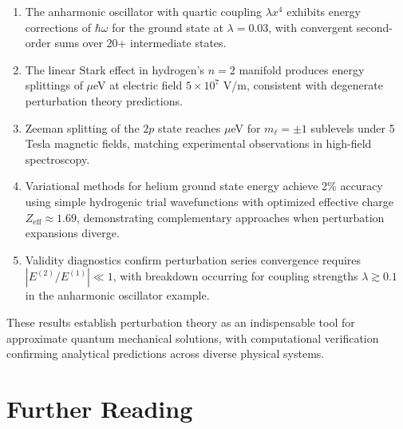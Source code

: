 \documentclass[a4paper, 11pt]{article}
\begin{document}
\begin{enumerate}
\item The anharmonic oscillator with quartic coupling $\lambda x^4$ exhibits energy
corrections of  $\hbar\omega$ for the ground state
at $\lambda = 0.03$, with convergent second-order sums over 20+ intermediate states.

\item The linear Stark effect in hydrogen's $n=2$ manifold produces energy splittings
of  $\mu$eV at electric field $5 \times 10^7$ V/m,
consistent with degenerate perturbation theory predictions.

\item Zeeman splitting of the $2p$ state reaches  $\mu$eV
for $m_\ell = \pm 1$ sublevels under 5 Tesla magnetic fields, matching experimental
observations in high-field spectroscopy.

\item Variational methods for helium ground state energy achieve 2\% accuracy using
simple hydrogenic trial wavefunctions with optimized effective charge
$Z_{\text{eff}} \approx 1.69$, demonstrating complementary approaches when
perturbation expansions diverge.

\item Validity diagnostics confirm perturbation series convergence requires
$|E^{(2)}/E^{(1)}| \ll 1$, with breakdown occurring for coupling strengths
$\lambda \gtrsim 0.1$ in the anharmonic oscillator example.
\end{enumerate}

These results establish perturbation theory as an indispensable tool for
approximate quantum mechanical solutions, with computational verification
confirming analytical predictions across diverse physical systems.

\section*{Further Reading}
\end{document}
